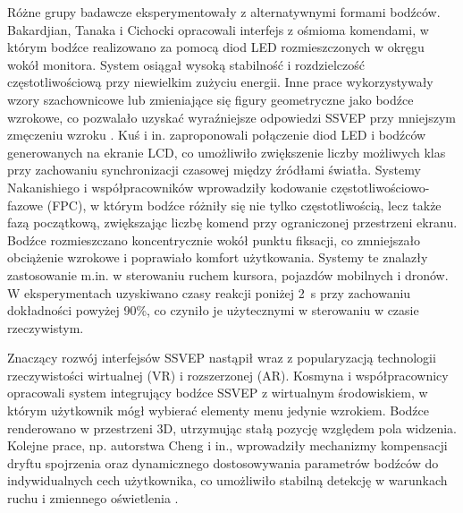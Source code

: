 Różne grupy badawcze eksperymentowały z alternatywnymi formami bodźców. Bakardjian, Tanaka i Cichocki \cite{bakardjian2010optimization} opracowali interfejs z ośmioma komendami, w którym bodźce realizowano za pomocą diod LED rozmieszczonych w okręgu wokół monitora. System osiągał wysoką stabilność i rozdzielczość częstotliwościową przy niewielkim zużyciu energii. Inne prace wykorzystywały wzory szachownicowe lub zmieniające się figury geometryczne jako bodźce wzrokowe, co pozwalało uzyskać wyraźniejsze odpowiedzi SSVEP przy mniejszym zmęczeniu wzroku \cite{chen2015}. Kuś i in. \cite{kus2013quantification} zaproponowali połączenie diod LED i bodźców generowanych na ekranie LCD, co umożliwiło zwiększenie liczby możliwych klas przy zachowaniu synchronizacji czasowej między źródłami światła. Systemy Nakanishiego i współpracowników \cite{nakanishi2015} wprowadziły kodowanie częstotliwościowo-fazowe (FPC), w którym bodźce różniły się nie tylko częstotliwością, lecz także fazą początkową, zwiększając liczbę komend przy ograniczonej przestrzeni ekranu. Bodźce rozmieszczano koncentrycznie wokół punktu fiksacji, co zmniejszało obciążenie wzrokowe i poprawiało komfort użytkowania. Systemy te znalazły zastosowanie m.in. w sterowaniu ruchem kursora, pojazdów mobilnych i dronów. W eksperymentach uzyskiwano czasy reakcji poniżej 2~s przy zachowaniu dokładności powyżej 90\%, co czyniło je użytecznymi w sterowaniu w czasie rzeczywistym.

Znaczący rozwój interfejsów SSVEP nastąpił wraz z popularyzacją technologii rzeczywistości wirtualnej (VR) i rozszerzonej (AR). Kosmyna i współpracownicy \cite{kosmyna2018} opracowali system integrujący bodźce SSVEP z wirtualnym środowiskiem, w którym użytkownik mógł wybierać elementy menu jedynie wzrokiem. Bodźce renderowano w przestrzeni 3D, utrzymując stałą pozycję względem pola widzenia. Kolejne prace, np. autorstwa Cheng i in., wprowadziły mechanizmy kompensacji dryftu spojrzenia oraz dynamicznego dostosowywania parametrów bodźców do indywidualnych cech użytkownika, co umożliwiło stabilną detekcję w warunkach ruchu i zmiennego oświetlenia \cite{cheng2020}.